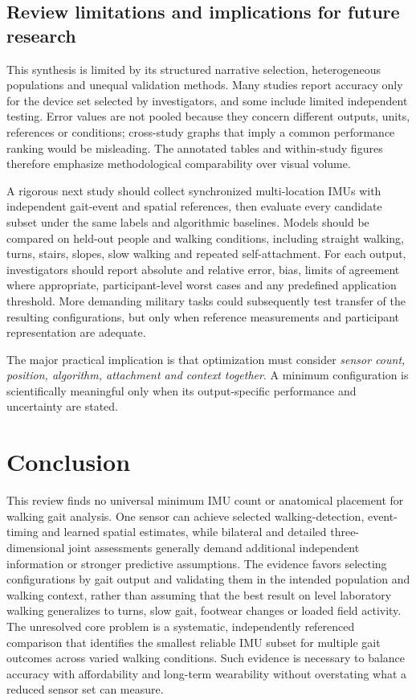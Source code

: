 \documentclass[10pt,a4paper,twocolumn]{article}
\begin{document}
\subsection{Review limitations and implications for future research}
\label{sec:disc-limits}

This synthesis is limited by its structured narrative selection, heterogeneous populations and unequal validation methods. Many studies report accuracy only for the device set selected by investigators, and some include limited independent testing. Error values are not pooled because they concern different outputs, units, references or conditions; cross-study graphs that imply a common performance ranking would be misleading. The annotated tables and within-study figures therefore emphasize methodological comparability over visual volume.

A rigorous next study should collect synchronized multi-location IMUs with independent gait-event and spatial references, then evaluate every candidate subset under the same labels and algorithmic baselines. Models should be compared on held-out people and walking conditions, including straight walking, turns, stairs, slopes, slow walking and repeated self-attachment. For each output, investigators should report absolute and relative error, bias, limits of agreement where appropriate, participant-level worst cases and any predefined application threshold. More demanding military tasks could subsequently test transfer of the resulting configurations, but only when reference measurements and participant representation are adequate.

The major practical implication is that optimization must consider \emph{sensor count, position, algorithm, attachment and context together}. A minimum configuration is scientifically meaningful only when its output-specific performance and uncertainty are stated.

\FloatBarrier

\section{Conclusion}
\label{sec:conclusion}

This review finds no universal minimum IMU count or anatomical placement for walking gait analysis. One sensor can achieve selected walking-detection, event-timing and learned spatial estimates, while bilateral and detailed three-dimensional joint assessments generally demand additional independent information or stronger predictive assumptions. The evidence favors selecting configurations by gait output and validating them in the intended population and walking context, rather than assuming that the best result on level laboratory walking generalizes to turns, slow gait, footwear changes or loaded field activity. The unresolved core problem is a systematic, independently referenced comparison that identifies the smallest reliable IMU subset for multiple gait outcomes across varied walking conditions. Such evidence is necessary to balance accuracy with affordability and long-term wearability without overstating what a reduced sensor set can measure.

\FloatBarrier



\end{document}
